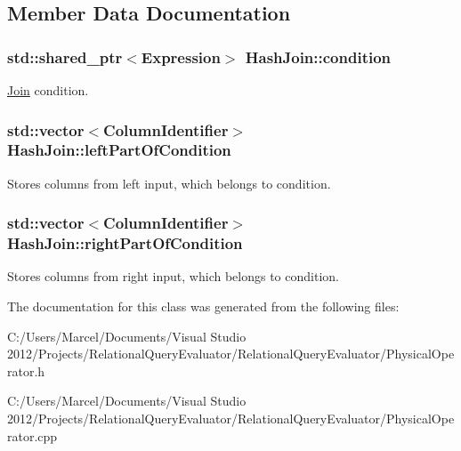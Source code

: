 \subsection{Member Data Documentation}
\hypertarget{class_hash_join_ac2524a0455d2379287a55d8cb148c40d}{
\subsubsection[{condition}]{\setlength{\rightskip}{0pt plus 5cm}std\+::shared\+\_\+ptr$<${\bf Expression}$>$ Hash\+Join\+::condition}}\label{class_hash_join_ac2524a0455d2379287a55d8cb148c40d}
\hyperlink{class_join}{Join} condition. \hypertarget{class_hash_join_a8ce73a163fdc30d10144277b51689541}{
\subsubsection[{left\+Part\+Of\+Condition}]{\setlength{\rightskip}{0pt plus 5cm}std\+::vector$<${\bf Column\+Identifier}$>$ Hash\+Join\+::left\+Part\+Of\+Condition}}\label{class_hash_join_a8ce73a163fdc30d10144277b51689541}
Stores columns from left input, which belongs to condition. \hypertarget{class_hash_join_ad4f1b144fc9a52d5218b1d2368c295b7}{
\subsubsection[{right\+Part\+Of\+Condition}]{\setlength{\rightskip}{0pt plus 5cm}std\+::vector$<${\bf Column\+Identifier}$>$ Hash\+Join\+::right\+Part\+Of\+Condition}}\label{class_hash_join_ad4f1b144fc9a52d5218b1d2368c295b7}
Stores columns from right input, which belongs to condition. 

The documentation for this class was generated from the following files\+:\begin{DoxyCompactItemize}
\item 
C\+:/\+Users/\+Marcel/\+Documents/\+Visual Studio 2012/\+Projects/\+Relational\+Query\+Evaluator/\+Relational\+Query\+Evaluator/Physical\+Operator.\+h\item 
C\+:/\+Users/\+Marcel/\+Documents/\+Visual Studio 2012/\+Projects/\+Relational\+Query\+Evaluator/\+Relational\+Query\+Evaluator/Physical\+Operator.\+cpp\end{DoxyCompactItemize}
